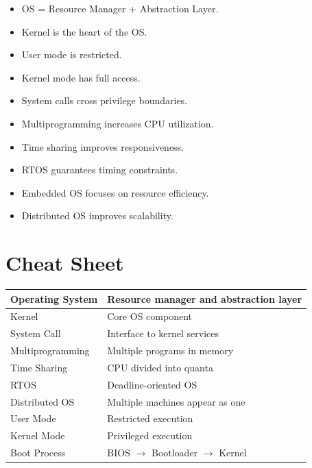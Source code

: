 \begin{itemize}
\item OS = Resource Manager + Abstraction Layer.
\item Kernel is the heart of the OS.
\item User mode is restricted.
\item Kernel mode has full access.
\item System calls cross privilege boundaries.
\item Multiprogramming increases CPU utilization.
\item Time sharing improves responsiveness.
\item RTOS guarantees timing constraints.
\item Embedded OS focuses on resource efficiency.
\item Distributed OS improves scalability.
\end{itemize}

\section{Cheat Sheet}

\begin{center}
\begin{tabular}{|p{5cm}|p{8cm}|}
\hline
Operating System & Resource manager and abstraction layer \\
\hline
Kernel & Core OS component \\
\hline
System Call & Interface to kernel services \\
\hline
Multiprogramming & Multiple programs in memory \\
\hline
Time Sharing & CPU divided into quanta \\
\hline
RTOS & Deadline-oriented OS \\
\hline
Distributed OS & Multiple machines appear as one \\
\hline
User Mode & Restricted execution \\
\hline
Kernel Mode & Privileged execution \\
\hline
Boot Process & BIOS $\rightarrow$ Bootloader $\rightarrow$ Kernel \\
\hline
\end{tabular}
\end{center}